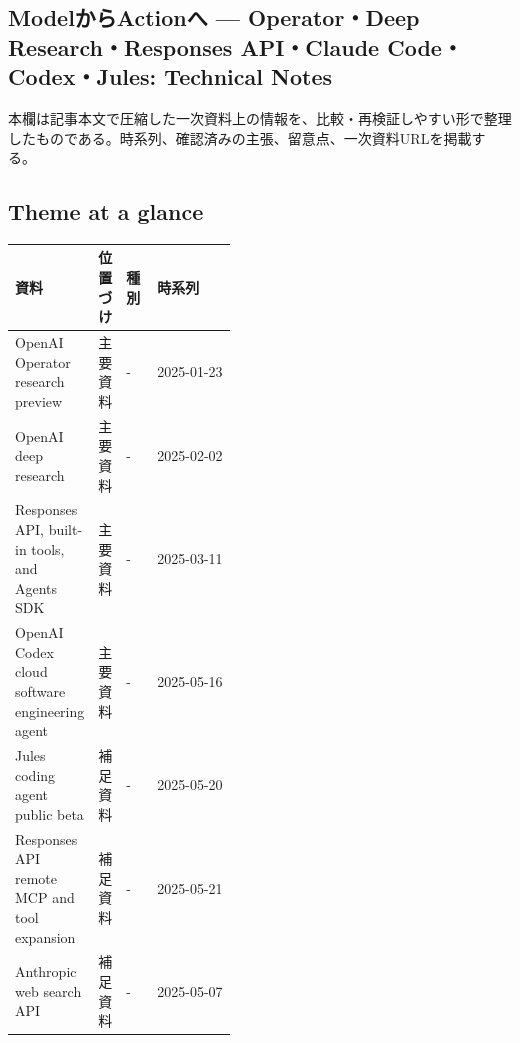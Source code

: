 \subsection*{ModelからActionへ — Operator・Deep Research・Responses API・Claude Code・Codex・Jules: Technical Notes}
本欄は記事本文で圧縮した一次資料上の情報を、比較・再検証しやすい形で整理したものである。時系列、確認済みの主張、留意点、一次資料URLを掲載する。
\medskip
\subsection*{Theme at a glance}
\begin{center}
\footnotesize
\begin{tabularx}{\linewidth}{@{}p{0.20\linewidth}p{0.10\linewidth}p{0.14\linewidth}X@{}}
\toprule
資料 & 位置づけ & 種別 & 時系列 \\
\midrule
OpenAI Operator research preview & 主要資料 & - & 2025-01-23   \\
OpenAI deep research & 主要資料 & - & 2025-02-02   \\
Responses API, built-in tools, and Agents SDK & 主要資料 & - & 2025-03-11   \\
OpenAI Codex cloud software engineering agent & 主要資料 & - & 2025-05-16   \\
Jules coding agent public beta & 補足資料 & - & 2025-05-20   \\
Responses API remote MCP and tool expansion & 補足資料 & - & 2025-05-21   \\
Anthropic web search API & 補足資料 & - & 2025-05-07   \\
\bottomrule
\end{tabularx}
\end{center}
\normalsize

